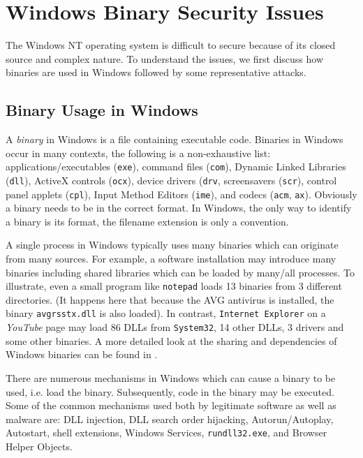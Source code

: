 \section{Windows Binary Security Issues}
\label{sec:problems}

The Windows NT operating system
is difficult to secure
because of its closed source and complex nature.
To understand the issues, we first discuss how
binaries are used in Windows followed
by some representative attacks.

\subsection{Binary Usage in Windows}

A {\em binary} in Windows is a file containing executable code.
Binaries in Windows occur in many contexts,
the following is a non-exhaustive list:
applications/executables ({\tt exe}),
command files ({\tt com}),
Dynamic Linked Libraries ({\tt dll}),
ActiveX controls ({\tt ocx}),
device drivers ({\tt drv},
screensavers ({\tt scr}),
control panel applets ({\tt cpl}),
Input Method Editors ({\tt ime}),
and codecs ({\tt acm}, {\tt ax}).
Obviously a binary needs to be in the correct format.
In Windows, the only way to identify a binary
is its format, the filename extension is only a convention.

A single process in Windows typically uses many binaries which
can originate from many sources.
For example, a software installation may introduce many binaries including
shared libraries which can be loaded by many/all processes.
To illustrate, even a small program like {\tt notepad}
loads 13 binaries from 3 different directories.
(It happens here that because the AVG antivirus is installed, the
binary {\tt avgrsstx.dll} is also loaded).
In contrast, {\tt Internet Explorer} on a {\em YouTube} page may load
86 DLLs from {\tt System32}, 14 other DLLs, 3 drivers and some other
binaries.
A more detailed look at the sharing and dependencies of Windows binaries
can be found in \cite{icse10}.

There are numerous mechanisms in Windows which can cause a binary to be used,
i.e. load the binary.
Subsequently, code in the binary may be executed.
Some of the common mechanisms used both by legitimate software
as well as malware are:
DLL injection, DLL search order hijacking, Autorun/Autoplay, Autostart,
shell extensions, Windows Services, {\tt rundll\linebreak[0]32.exe},
and Browser Helper Objects.

